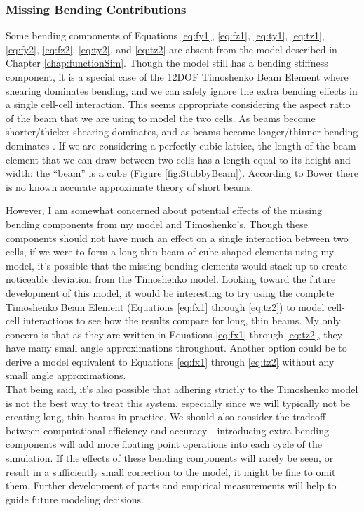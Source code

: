 {\subsubsection{Missing Bending Contributions}\label{sec:bendingdominance}

Some bending components of Equations \ref{eq:fy1}, \ref{eq:fz1}, \ref{eq:ty1}, \ref{eq:tz1}, \ref{eq:fy2}, \ref{eq:fz2}, \ref{eq:ty2},  and \ref{eq:tz2} are absent from the model described in Chapter \ref{chap:functionSim}.  Though the model still has a bending stiffness component, it is a special case of the 12DOF Timoshenko Beam Element where shearing dominates bending, and we can safely ignore the extra bending effects in a single cell-cell interaction.  This seems appropriate considering the aspect ratio of the beam that we are using to model the two cells.  As beams become shorter/thicker shearing dominates, and as beams become longer/thinner bending dominates \cite{Bower2009}.  If we are considering a perfectly cubic lattice, the length of the beam element that we can draw between two cells has a length equal to its height and width: the ``beam'' is a cube (Figure \ref{fig:StubbyBeam}).  According to Bower \cite{Bower2009} there is no known accurate approximate theory of short beams.

However, I am somewhat concerned about potential effects of the missing bending components from my model and Timoshenko's.  Though these components should not have much an effect on a single interaction between two cells, if we were to form a long thin beam of cube-shaped elements using my model, it's possible that the missing bending elements would stack up to create noticeable deviation from the Timoshenko model.  Looking toward the future development of this model, it would be interesting to try using the complete Timoshenko Beam Element (Equations \ref{eq:fx1} through \ref{eq:tz2}) to model cell-cell interactions to see how the results compare for long, thin beams. My only concern is that as they are written in Equations \ref{eq:fx1} through \ref{eq:tz2}, they have many small angle approximations throughout.  Another option could be to derive a model equivalent to Equations \ref{eq:fx1} through \ref{eq:tz2} without any small angle approximations.\\

That being said, it's also possible that adhering strictly to the Timoshenko model is not the best way to treat this system, especially since we will typically not be creating long, thin beams in practice.  We should also consider the tradeoff between computational efficiency and accuracy - introducing extra bending components will add more floating point operations into each cycle of the simulation.  If the effects of these bending components will rarely be seen, or result in a sufficiently small correction to the model, it might be fine to omit them.  Further development of parts and empirical measurements will help to guide future modeling decisions.

}
